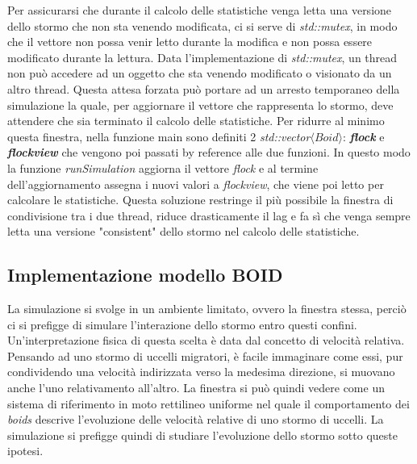 \documentclass{article}
\begin{document}
Per assicurarsi che durante il calcolo delle statistiche venga letta una versione dello stormo che non sta venendo modificata, ci si serve di \textit{std::mutex}, in modo che il vettore non possa venir letto durante la modifica e non possa essere modificato durante la lettura. Data l'implementazione di \textit{std::mutex}, un thread non può accedere ad un oggetto che sta venendo modificato o visionato da un altro thread. Questa attesa forzata può portare ad un arresto temporaneo della simulazione la quale, per aggiornare il vettore che rappresenta lo stormo, deve attendere che sia terminato il calcolo delle statistiche. Per ridurre al minimo questa finestra, nella funzione main sono definiti 2 \textit{std::vector$\langle Boid\rangle$}: \textbf{\textit{flock}} e \textbf{\textit{flock\textunderscore}\textit{view}} che vengono poi passati by reference alle due funzioni. In questo modo la funzione \textit{runSimulation} aggiorna il vettore \textit{flock} e al termine dell'aggiornamento assegna i nuovi valori a \textit{flock\textunderscore}\textit{view}, che viene poi letto per calcolare le statistiche. Questa soluzione restringe il più possibile la finestra di condivisione tra i due thread, riduce drasticamente il lag e fa sì che venga sempre letta una versione "consistent" dello stormo nel calcolo delle statistiche.

\subsection{Implementazione modello BOID}
La simulazione si svolge in un ambiente limitato, ovvero la finestra stessa, perciò ci si prefigge di simulare l'interazione dello stormo entro questi confini. Un'interpretazione fisica di questa scelta è data dal concetto di velocità relativa. Pensando ad uno stormo di uccelli migratori, è facile immaginare come essi, pur condividendo una velocità indirizzata verso la medesima direzione, si muovano anche l'uno relativamento all'altro. La finestra si può quindi vedere come un sistema di riferimento in moto rettilineo uniforme nel quale il comportamento dei \textit{boids} descrive l'evoluzione delle velocità relative di uno stormo di uccelli. La simulazione si prefigge quindi di studiare l'evoluzione dello stormo sotto queste ipotesi. 
\end{document}
